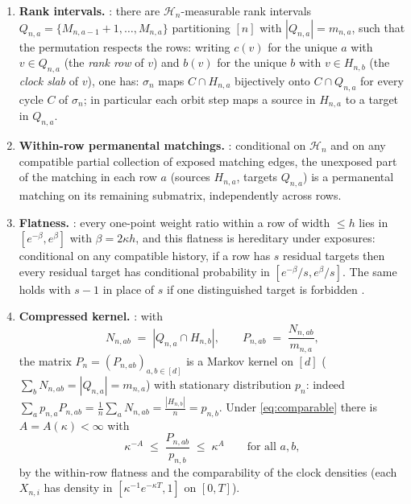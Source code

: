 \documentclass[11pt]{article}
\newcommand{\1}{\mathbf{1}}
\newcommand{\cH}{\mathcal{H}}
\theoremstyle{remark}
\begin{document}
\begin{enumerate}[label=(S\arabic*)]
\item \textbf{Rank intervals.} \cite[Section~6.2]{Lon26}: there are
$\cH_n$-measurable rank intervals
$Q_{n,a}=\{M_{n,a-1}+1,\dots,M_{n,a}\}$ partitioning $[n]$ with
$|Q_{n,a}|=m_{n,a}$, such that the permutation respects the rows: writing
$c(v)$ for the unique $a$ with $v\in Q_{n,a}$ (the \emph{rank row} of $v$)
and $b(v)$ for the unique $b$ with $v\in H_{n,b}$ (the \emph{clock slab} of
$v$), one has: $\sigma_n$ maps $C\cap H_{n,a}$ bijectively onto
$C\cap Q_{n,a}$ for every cycle $C$ of $\sigma_n$; in particular each orbit
step maps a source in $H_{n,a}$ to a target in $Q_{n,a}$.
\item \textbf{Within-row permanental matchings.}
\cite[Lemma~6.4]{Lon26}: conditional on $\cH_n$ and on any compatible partial
collection of exposed matching edges, the unexposed part of the matching in
each row $a$ (sources $H_{n,a}$, targets $Q_{n,a}$) is a permanental matching
on its remaining submatrix, independently across rows.
\item \textbf{Flatness.} \cite[Lemmas~6.5, 6.6]{Lon26}: every one-point
weight ratio within a row of width $\le h$ lies in $[e^{-\beta},e^{\beta}]$
with $\beta=2\kappa h$, and this flatness is hereditary under exposures:
conditional on any compatible history, if a row has $s$ residual targets then
every residual target has conditional probability in $[e^{-\beta}/s,
e^{\beta}/s]$. The same holds with $s-1$ in place of $s$ if one distinguished
target is forbidden \cite[Lemma~6.6]{Lon26}.
\item \textbf{Compressed kernel.} \cite[Section~6.2]{Lon26}: with
\[
N_{n,ab}\;=\;|Q_{n,a}\cap H_{n,b}|,\qquad
P_{n,ab}\;=\;\frac{N_{n,ab}}{m_{n,a}},
\]
the matrix $P_n=(P_{n,ab})_{a,b\in[d]}$ is a Markov kernel on $[d]$
($\sum_bN_{n,ab}=|Q_{n,a}|=m_{n,a}$) with stationary distribution $p_n$:
indeed $\sum_a p_{n,a}P_{n,ab}=\frac1n\sum_a N_{n,ab}=\frac{|H_{n,b}|}{n}
=p_{n,b}$. Under \eqref{eq:comparable} there is $A=A(\kappa)<\infty$ with
\begin{equation}\label{eq:ratio-bound}
\kappa^{-A}\;\le\;\frac{P_{n,ab}}{p_{n,b}}\;\le\;\kappa^{A}
\qquad\text{for all }a,b,
\end{equation}
by the within-row flatness and the comparability of the clock densities
(each $X_{n,i}$ has density in $[\kappa^{-1}e^{-\kappa T},1]$ on $[0,T]$).
\end{enumerate}
\end{document}
